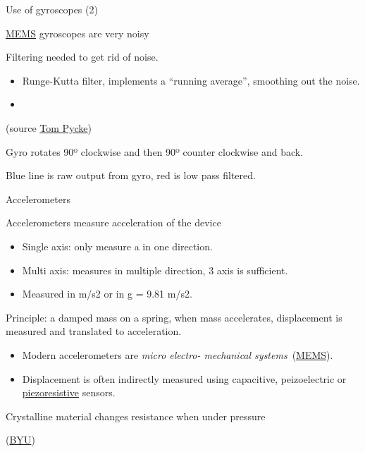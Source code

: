 \documentclass[compress]{beamer}
\providecommand{\tightlist}{%
  \setlength{\itemsep}{0pt}\setlength{\parskip}{0pt}}
\begin{document}
\begin{frame}{Use of gyroscopes (2)}

\href{http://en.wikipedia.org/wiki/Microelectromechanical_systems}{MEMS}
gyroscopes are very noisy

Filtering needed to get rid of noise.

\begin{itemize}
\tightlist
\item
  Runge-Kutta filter, implements a ``running average'', smoothing out
  the noise.
\end{itemize}

\begin{itemize}
\tightlist
\item
  ~
\end{itemize}

(source
\href{http://tom.pycke.be/mav/70/gyroscope-to-roll-pitch-and-yaw}{Tom
Pycke})

Gyro rotates 90º clockwise and then 90º counter clockwise and back.

Blue line is raw output from gyro, red is low pass filtered.

\end{frame}

\begin{frame}{Accelerometers}

Accelerometers measure acceleration of the device

\begin{itemize}
\tightlist
\item
  Single axis: only measure a in one direction.
\item
  Multi axis: measures in multiple direction, 3 axis is sufficient.
\item
  Measured in m/s2 or in g = 9.81 m/s2.
\end{itemize}

Principle: a damped mass on a spring, when mass accelerates,
displacement is measured and translated to acceleration.

\begin{itemize}
\tightlist
\item
  Modern accelerometers are \emph{micro electro- mechanical
  systems}~(\href{http://en.wikipedia.org/wiki/Microelectromechanical_systems}{MEMS}).
\item
  Displacement is often indirectly measured using capacitive,
  peizoelectric or
  \href{http://en.wikipedia.org/wiki/Piezoresistive_effect}{piezoresistive}
  sensors.
\end{itemize}

Crystalline material changes resistance when under pressure

(\href{http://research.et.byu.edu/llhwww/intro/memsintro.html}{BYU})

\end{frame}
\end{document}

